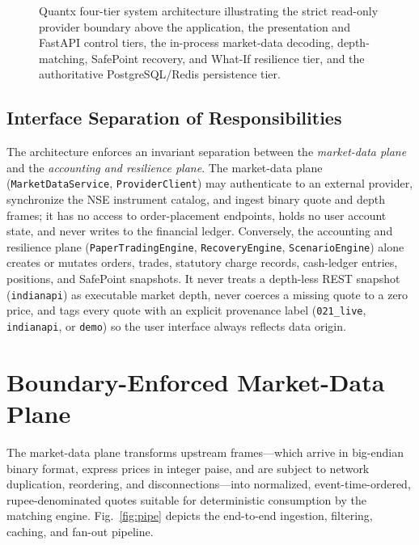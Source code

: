 \documentclass[12pt]{article}
\begin{document}
\begin{figure}[!htbp]
{}
\caption{Quantx four-tier system architecture illustrating the strict read-only provider boundary above the application, the presentation and FastAPI control tiers, the in-process market-data decoding, depth-matching, SafePoint recovery, and What-If resilience tier, and the authoritative PostgreSQL/Redis persistence tier.}
\label{fig:arch}
\end{figure}

\subsection{Interface Separation of Responsibilities}
The architecture enforces an invariant separation between the \emph{market-data plane} and the \emph{accounting and resilience plane}. The market-data plane (\texttt{MarketDataService}, \texttt{ProviderClient}) may authenticate to an external provider, synchronize the NSE instrument catalog, and ingest binary quote and depth frames; it has no access to order-placement endpoints, holds no user account state, and never writes to the financial ledger. Conversely, the accounting and resilience plane (\texttt{PaperTradingEngine}, \texttt{RecoveryEngine}, \texttt{ScenarioEngine}) alone creates or mutates orders, trades, statutory charge records, cash-ledger entries, positions, and SafePoint snapshots. It never treats a depth-less REST snapshot (\texttt{indianapi}) as executable market depth, never coerces a missing quote to a zero price, and tags every quote with an explicit provenance label (\texttt{021\_live}, \texttt{indianapi}, or \texttt{demo}) so the user interface always reflects data origin.

\section{Boundary-Enforced Market-Data Plane}

The market-data plane transforms upstream frames—which arrive in big-endian binary format, express prices in integer paise, and are subject to network duplication, reordering, and disconnections—into normalized, event-time-ordered, rupee-denominated quotes suitable for deterministic consumption by the matching engine. Fig.~\ref{fig:pipe} depicts the end-to-end ingestion, filtering, caching, and fan-out pipeline.
\end{document}
